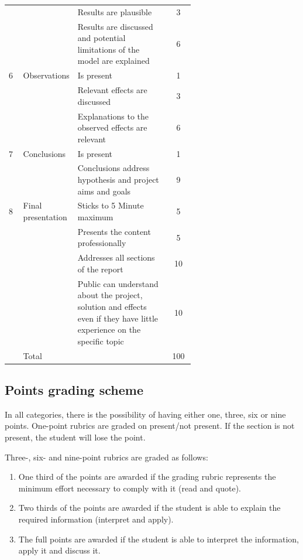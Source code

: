 \begin{table}[h]
\begin{tabular}{l p{0.13\linewidth} p{0.5\linewidth} c}
			\cline{3-4}
			  & & Results are plausible & 3\\
			\cline{3-4}
			  & & Results are discussed and potential limitations of the model are explained & 6\\
			 \hline
			 6 & Observations & Is present & 1\\
			\cline{3-4}
			& & Relevant effects are discussed & 3\\
			\cline{3-4}
			& & Explanations to the observed effects are relevant & 6\\
			\hline
			7 & Conclusions & Is present & 1 \\
			\cline{3-4}
			& & Conclusions address hypothesis and project aims and goals & 9 \\
			\hline
			8 & Final presentation & Sticks to 5 Minute maximum & 5 \\
			\cline{3-4}
			&& Presents the content professionally & 5\\
			\cline{3-4}
			&& Addresses all sections of the report & 10 \\
			\cline{3-4}
			&& Public can understand about the project, solution and effects even if they have little experience on the specific topic & 10\\
			\hline
			\hline
			 & Total & & 100 \\
		\end{tabular}
	\end{table}

	\subsection{Points grading scheme}
	
	In all categories, there is the possibility of having either one, three, six or nine points. One-point rubrics are graded on present/not present. If the section is not present, the student will lose the point.
	
	Three-, six- and nine-point rubrics are graded as follows:
	
	\begin{enumerate}
		\item One third of the points are awarded if the grading rubric represents the minimum effort necessary to comply with it (read and quote).
		\item Two thirds of the points are awarded if the student is able to explain the required information  (interpret and apply).
		\item The full points are awarded if the student is able to interpret the information, apply it and discuss it.
	\end{enumerate}

